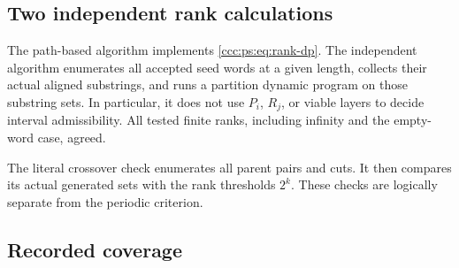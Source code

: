 \documentclass[11pt,letterpaper]{article}
\theoremstyle{definition}
\theoremstyle{remark}
\begin{document}
\subsection{Two independent rank calculations}

The path-based algorithm implements \eqref{ccc:ps:eq:rank-dp}. The independent
algorithm enumerates all accepted seed words at a given length, collects
their actual aligned substrings, and runs a partition dynamic program on
those substring sets. In particular, it does not use $P_i$, $R_j$, or
viable layers to decide interval admissibility. All tested finite ranks,
including infinity and the empty-word case, agreed.

The literal crossover check enumerates all parent pairs and cuts. It then
compares its actual generated sets with the rank thresholds $2^k$.
These checks are logically separate from the periodic criterion.

\subsection{Recorded coverage}
\end{document}
